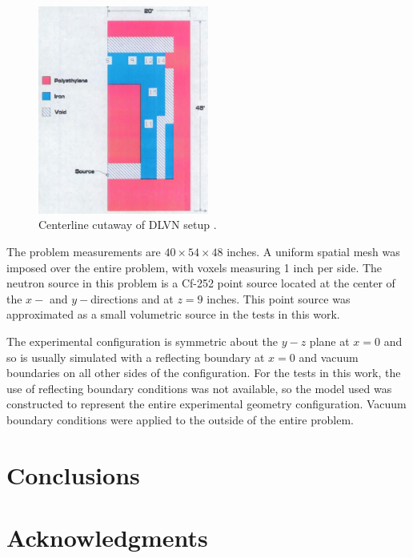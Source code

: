 \documentclass{article} %
\begin{document}
\begin{figure}[!htb]
\centering
\includegraphics[width=0.5\textwidth]{img/dlvn.png}
\caption{Centerline cutaway of DLVN setup \cite{sw-dlvn}.}
\label{dlvn}
\end{figure}

The problem measurements are $40\times54\times48$ inches. A uniform spatial
mesh was imposed over the entire problem, with voxels measuring 1 inch per
side. The neutron source in this problem is a Cf-252 point source located at
the center of the $x-$ and $y-$directions and at $z = 9$ inches. This point
source was approximated as a small volumetric source in the tests in this
work.

The experimental configuration is symmetric about the $y-z$ plane at $x = 0$
and so is usually simulated with a reflecting boundary at $x = 0$ and vacuum
boundaries on all other sides of the configuration. For the tests in this work,
the use of reflecting boundary conditions was not available, so the model used 
was constructed to represent the entire experimental geometry configuration.
Vacuum boundary conditions were applied to the outside of the entire problem.

\section{Conclusions}
\label{sec:conclusions}

\pagebreak
\section*{Acknowledgments}
\end{document}

